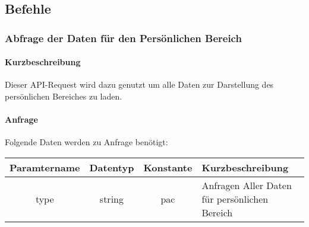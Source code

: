 \subsection{Befehle}
\subsubsection{Abfrage der Daten für den Persönlichen Bereich}
\paragraph{Kurzbeschreibung}Dieser API-Request wird dazu genutzt um alle Daten zur Darstellung des persönlichen Bereiches zu laden.
\paragraph{Anfrage}Folgende Daten werden zu Anfrage benötigt:
\begin{table}[H]
	\begin{tabular}{|c|c|c|p{6.5cm}|}
		\hline
		\textbf{Paramtername} & \textbf{Datentyp} & \textbf{Konstante} & \textbf{Kurzbeschreibung}                                                                                               \\ \hline
		type                & string            & pac                & Anfragen Aller Daten für persönlichen Bereich \\ \hline
	\end{tabular}
\end{table}
